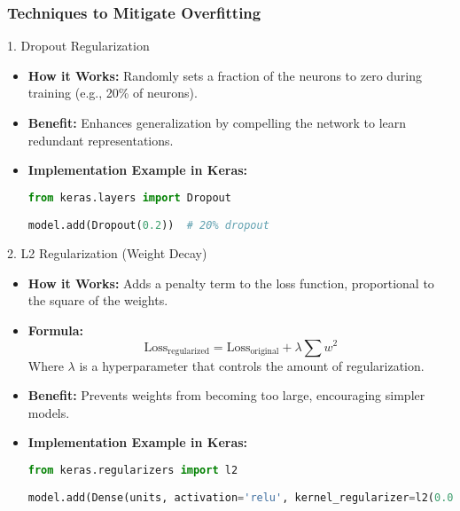 \documentclass[aspectratio=169]{beamer}
\begin{document}
\begin{frame}[fragile]
    \frametitle{Techniques to Mitigate Overfitting}
    \begin{block}{1. Dropout Regularization}
        \begin{itemize}
            \item \textbf{How it Works:} Randomly sets a fraction of the neurons to zero during training (e.g., 20\% of neurons).
            \item \textbf{Benefit:} Enhances generalization by compelling the network to learn redundant representations.
            \item \textbf{Implementation Example in Keras:}
            \begin{lstlisting}[language=Python]
from keras.layers import Dropout

model.add(Dropout(0.2))  # 20% dropout
            \end{lstlisting}
        \end{itemize}
    \end{block}

    \begin{block}{2. L2 Regularization (Weight Decay)}
        \begin{itemize}
            \item \textbf{How it Works:} Adds a penalty term to the loss function, proportional to the square of the weights.
            \item \textbf{Formula:}
            \begin{equation}
                \text{Loss}_{\text{regularized}} = \text{Loss}_{\text{original}} + \lambda \sum w^2
            \end{equation}
            Where \( \lambda \) is a hyperparameter that controls the amount of regularization.
            \item \textbf{Benefit:} Prevents weights from becoming too large, encouraging simpler models.
            \item \textbf{Implementation Example in Keras:}
            \begin{lstlisting}[language=Python]
from keras.regularizers import l2

model.add(Dense(units, activation='relu', kernel_regularizer=l2(0.01)))
            \end{lstlisting}
        \end{itemize}
    \end{block}
\end{frame}
\end{document}
